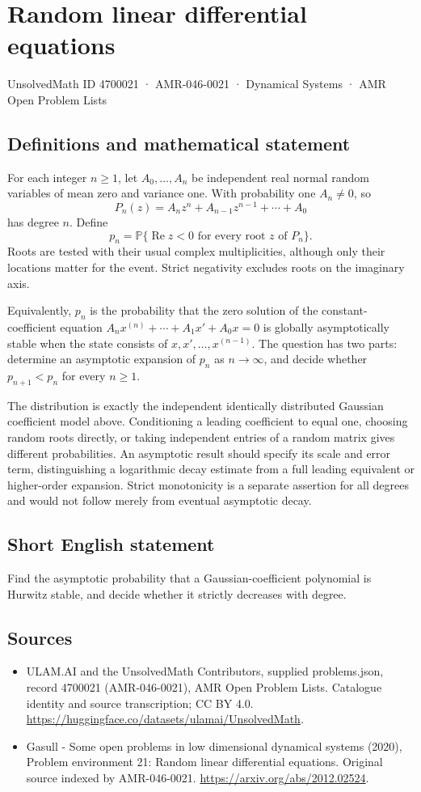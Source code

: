 \documentclass[11pt,a4paper]{article}
\begin{document}
\section*{Random linear differential equations}\label{4700021}
{\small UnsolvedMath ID 4700021 · AMR-046-0021 · Dynamical Systems · AMR Open Problem Lists}
\subsection{Definitions and mathematical statement}
For each integer $n\ge1$, let $A_0,\ldots,A_n$ be independent real normal
random variables of mean zero and variance one. With probability one
$A_n\ne0$, so
\[
 P_n(z)=A_nz^n+A_{n-1}z^{n-1}+\cdots+A_0
\]
has degree $n$. Define
\[
 p_n=\mathbb P\{\operatorname{Re}z<0
                 \text{ for every root }z\text{ of }P_n\}.
\]
Roots are tested with their usual complex multiplicities, although only
their locations matter for the event. Strict negativity excludes roots
on the imaginary axis.

Equivalently, $p_n$ is the probability that the zero solution of the
constant-coefficient equation
$A_nx^{(n)}+\cdots+A_1x'+A_0x=0$ is globally asymptotically stable
when the state consists of $x,x',\ldots,x^{(n-1)}$. The question has two
parts: determine an asymptotic expansion of $p_n$ as $n\to\infty$, and
decide whether $p_{n+1}<p_n$ for every $n\ge1$.

The distribution is exactly the independent identically distributed
Gaussian coefficient model above. Conditioning a leading coefficient to
equal one, choosing random roots directly, or taking independent entries
of a random matrix gives different probabilities. An asymptotic result
should specify its scale and error term, distinguishing a logarithmic
decay estimate from a full leading equivalent or higher-order expansion.
Strict monotonicity is a separate assertion for all degrees and would not
follow merely from eventual asymptotic decay.
\subsection{Short English statement}
Find the asymptotic probability that a Gaussian-coefficient polynomial is Hurwitz stable, and decide whether it strictly decreases with degree.
\subsection{Sources}
\begin{itemize}
\item[S1] ULAM.AI and the UnsolvedMath Contributors, supplied problems.json, record 4700021 (AMR-046-0021), AMR Open Problem Lists. Catalogue identity and source transcription; CC BY 4.0.
\url{https://huggingface.co/datasets/ulamai/UnsolvedMath}.
\item[S2] Gasull - Some open problems in low dimensional dynamical systems (2020), Problem environment 21: Random linear differential equations. Original source indexed by AMR-046-0021.
\url{https://arxiv.org/abs/2012.02524}.
\end{itemize}
\end{document}

